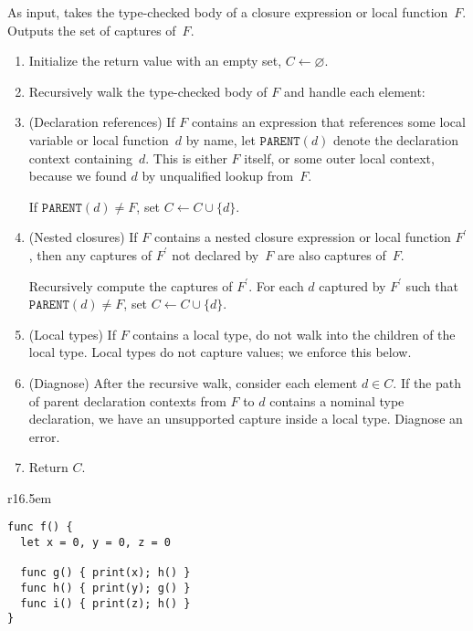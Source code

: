 \documentclass[../generics]{subfiles}
\begin{document}
\begin{algorithm}\label{closure captures algorithm}
As input, takes the type-checked body of a closure expression or local function~$F$. Outputs the set of captures of~$F$.
\begin{enumerate}
\item Initialize the return value with an empty set, $C\leftarrow\varnothing$.
\item Recursively walk the type-checked body of $F$ and handle each element:
\item (Declaration references) If $F$ contains an expression that references some local variable or local function~$d$ by name, let $\texttt{PARENT}(d)$ denote the declaration context containing~$d$. This is either $F$ itself, or some outer local context, because we found $d$ by unqualified lookup from~$F$.

If $\texttt{PARENT}(d)\neq F$, set $C\leftarrow C\cup\{d\}$.
\item (Nested closures) If $F$ contains a nested closure expression or local function $F^\prime\!$, then any captures of $F^\prime$ not declared by~$F$ are also captures of~$F$.

Recursively compute the captures of $F^\prime\!$. For each $d$ captured by $F^\prime$ such that $\texttt{PARENT}(d)\neq F$, set $C\leftarrow C\cup\{d\}$.

\item (Local types) If $F$ contains a local type, do not walk into the children of the local type. Local types do not capture values; we enforce this below.

\item (Diagnose) After the recursive walk, consider each element $d\in C$. If the path of parent declaration contexts from $F$ to $d$ contains a nominal type declaration, we have an unsupported capture inside a local type. Diagnose an error.

\item Return $C$.
\end{enumerate}
\end{algorithm}

\begin{wrapfigure}[9]{r}{16.5em}
\begin{minipage}{16.5em}
\begin{Verbatim}
func f() {
  let x = 0, y = 0, z = 0

  func g() { print(x); h() }
  func h() { print(y); g() }
  func i() { print(z); h() }
}
\end{Verbatim}
\end{minipage}
\end{wrapfigure}
\end{document}
